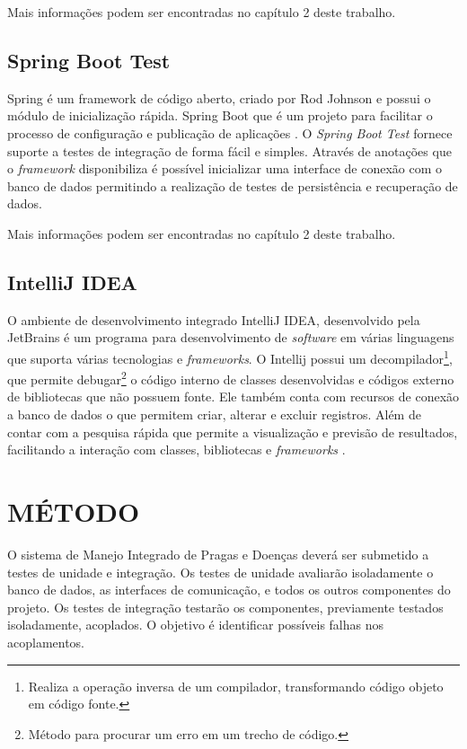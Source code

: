 Mais informações podem ser encontradas no capítulo 2 deste trabalho.

\subsection{Spring Boot Test}

 Spring é um framework de código aberto, criado por Rod Johnson e possui o módulo de inicialização rápida. Spring Boot que é um projeto para facilitar o processo de configuração e publicação de aplicações \cite{spring}. O \textit{Spring Boot Test}  fornece suporte a testes de integração de forma fácil e simples. Através de anotações que o \textit{framework} disponibiliza é possível inicializar uma interface de conexão com o banco de dados permitindo a realização de testes de persistência e recuperação de dados.


Mais informações podem ser encontradas no capítulo 2 deste trabalho.

\subsection{IntelliJ IDEA}

O ambiente de desenvolvimento integrado IntelliJ IDEA, desenvolvido pela JetBrains é um programa  para desenvolvimento de \textit{software} em várias linguagens que suporta várias tecnologias e \textit{frameworks}. O Intellij possui um decompilador\footnote{Realiza a operação inversa de um compilador, transformando código objeto em código fonte.}, que permite debugar\footnote{Método para procurar um erro em um trecho de código.} o código interno de classes desenvolvidas e códigos externo de bibliotecas que não possuem fonte. Ele também conta com recursos de conexão a banco de dados o que permitem criar, alterar e excluir registros. Além de contar com a pesquisa rápida que permite a visualização e previsão de resultados, facilitando a interação com classes, bibliotecas e \textit{frameworks} \cite{intellij}.


\section{MÉTODO}

O sistema de Manejo Integrado de Pragas e Doenças deverá ser submetido a testes de unidade e integração. Os testes de unidade avaliarão isoladamente o banco de dados, as interfaces de comunicação, e todos os outros componentes do projeto. Os testes de integração testarão os componentes, previamente testados isoladamente, acoplados. O objetivo é identificar possíveis falhas nos acoplamentos. 


